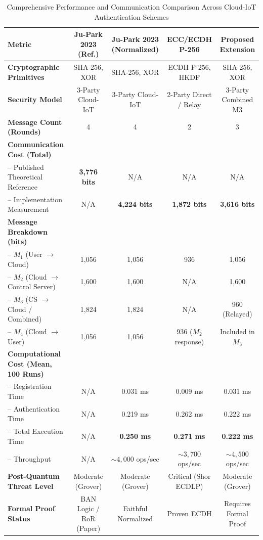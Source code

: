 \begin{table}[t]
\centering
\caption{Comprehensive Performance and Communication Comparison Across Cloud-IoT Authentication Schemes}
\label{tab:protocol_comparison}
\begin{tabular}{lcccc}
\hline
\textbf{Metric} & \textbf{Ju-Park 2023 (Ref.)} & \textbf{Ju-Park 2023 (Normalized)} & \textbf{ECC/ECDH P-256} & \textbf{Proposed Extension} \\
\hline
\textbf{Cryptographic Primitives} & SHA-256, XOR & SHA-256, XOR & ECDH P-256, HKDF & SHA-256, XOR \\
\textbf{Security Model} & 3-Party Cloud-IoT & 3-Party Cloud-IoT & 2-Party Direct / Relay & 3-Party Combined M3 \\
\textbf{Message Count (Rounds)} & 4 & 4 & 2 & 3 \\
\hline
\textbf{Communication Cost (Total)} & & & & \\
-- Published Theoretical Reference & \textbf{3,776 bits} & N/A & N/A & N/A \\
-- Implementation Measurement & N/A & \textbf{4,224 bits} & \textbf{1,872 bits} & \textbf{3,616 bits} \\
\hline
\textbf{Message Breakdown (bits)} & & & & \\
-- $M_1$ (User $\rightarrow$ Cloud) & 1,056 & 1,056 & 936 & 1,056 \\
-- $M_2$ (Cloud $\rightarrow$ Control Server) & 1,600 & 1,600 & N/A & 1,600 \\
-- $M_3$ (CS $\rightarrow$ Cloud / Combined) & 1,824 & 1,824 & N/A & 960 (Relayed) \\
-- $M_4$ (Cloud $\rightarrow$ User) & 1,056 & 1,056 & 936 ($M_2$ response) & Included in $M_3$ \\
\hline
\textbf{Computational Cost (Mean, 100 Runs)} & & & & \\
-- Registration Time & N/A & 0.031 ms & 0.009 ms & 0.031 ms \\
-- Authentication Time & N/A & 0.219 ms & 0.262 ms & 0.222 ms \\
-- Total Execution Time & N/A & \textbf{0.250 ms} & \textbf{0.271 ms} & \textbf{0.222 ms} \\
-- Throughput & N/A & $\sim 4,000$ ops/sec & $\sim 3,700$ ops/sec & $\sim 4,500$ ops/sec \\
\hline
\textbf{Post-Quantum Threat Level} & Moderate (Grover) & Moderate (Grover) & Critical (Shor ECDLP) & Moderate (Grover) \\
\textbf{Formal Proof Status} & BAN Logic / RoR (Paper) & Faithful Normalized & Proven ECDH & Requires Formal Proof \\
\hline
\end{tabular}
\end{table}
